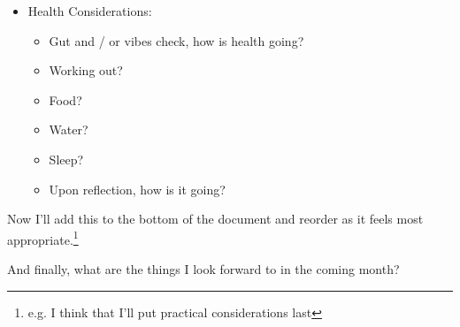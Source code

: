 \documentclass[12pt]{article}
\renewcommand{\,}{\textsuperscript{,}}
\begin{document}
\begin{itemize}
\begin{itemize}
\begin{itemize}
\item Upon reflection, how goes? Anything missed in those four?

\end{itemize}

\item Outreach:

\begin{itemize}

\item How's it going?

\item How goes prep for the rest of your life?

\item How goes prep / submission of workshops?

\item Any talks coming?

\item Upon reflection, how goes? Anything missed in those three

\end{itemize}

\item Upon reflection, how is it going?

\end{itemize}

\item Health Considerations:

\begin{itemize}

\item Gut and / or vibes check, how is health going?

\item Working out?

\item Food?

\item Water?

\item Sleep?

\item Upon reflection, how is it going?

\end{itemize}

\end{itemize}

Now I'll add this to the bottom of the document and reorder as it feels most appropriate.\footnote{e.g. I think that I'll put practical considerations last}

And finally, what are the things I look forward to in the coming month?
\end{document}

